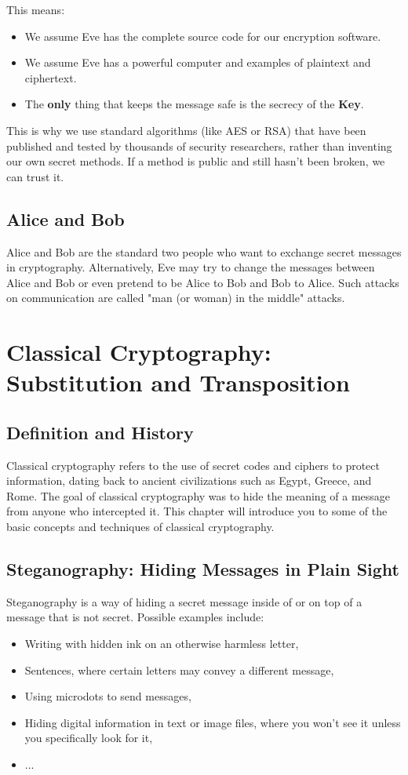 \documentclass[11pt,a4paper]{report}
\begin{document}
This means:
\begin{itemize}
    \item We assume Eve has the complete source code for our encryption software.
    \item We assume Eve has a powerful computer and examples of plaintext and ciphertext.
    \item The \textbf{only} thing that keeps the message safe is the secrecy of the \textbf{Key}.
\end{itemize}

This is why we use standard algorithms (like AES or RSA) that have been published and tested by thousands of security researchers, rather than inventing our own secret methods. If a method is public and still hasn't been broken, we can trust it.

\subsection{Alice and Bob}
Alice and Bob are the standard two people who want to exchange secret messages in cryptography.
Alternatively, Eve may try to change the messages between Alice and Bob or even pretend to be Alice to Bob and Bob to Alice.
Such attacks on communication are called "man (or woman) in the middle" attacks.

\section{Classical Cryptography: Substitution and Transposition}

\subsection{Definition and History}

Classical cryptography refers to the use of secret codes and ciphers to protect information, dating back to ancient civilizations such as Egypt, Greece, and Rome.
The goal of classical cryptography was to hide the meaning of a message from anyone who intercepted it.
This chapter will introduce you to some of the basic concepts and techniques of classical cryptography.
\subsection{Steganography: Hiding Messages in Plain Sight}
Steganography is a way of hiding a secret message inside of or on top of a message that is not secret.
Possible examples include:
\begin{itemize}
\item Writing with hidden ink on an otherwise harmless letter,
\item Sentences, where certain letters may convey a different message,
\item Using microdots to send messages,
\item Hiding digital information in text or image files, where you won't see it unless you specifically look for it,
\item ...
\end{itemize}
\end{document}
